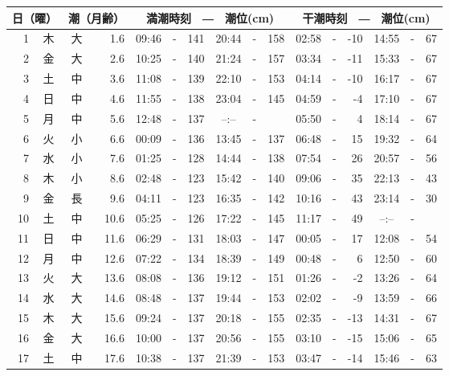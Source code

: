 \documentclass[12pt.a4j]{jsarticle}
\begin{document}
\begin{center}
\begin{table}[ht]
    \begin{tabular}{|rc|cr|ccrccr|ccrccr|}
    \hline
    \multicolumn{2}{|c|}{日（曜）} & \multicolumn{2}{c|}{潮（月齢）} & \multicolumn{6}{c|}{満潮時刻　―　潮位(cm)} & \multicolumn{6}{c|}{干潮時刻　―　潮位(cm)} \\
 \hline
 1 & 木 & 大 &  1.6 &  09:46 &-& 141  &  20:44 &-& 158  &   02:58 &-& -10  &   14:55 &-&  67  \\
 2 & 金 & 大 &  2.6 &  10:25 &-& 140  &  21:24 &-& 157  &   03:34 &-& -11  &   15:33 &-&  67  \\
 3 & 土 & 中 &  3.6 &  11:08 &-& 139  &  22:10 &-& 153  &   04:14 &-& -10  &   16:17 &-&  67  \\
 4 & 日 & 中 &  4.6 &  11:55 &-& 138  &  23:04 &-& 145  &   04:59 &-&  -4  &   17:10 &-&  67  \\
 5 & 月 & 中 &  5.6 &  12:48 &-& 137  &  --:-- &-&     &   05:50 &-&   4  &   18:14 &-&  67  \\
 6 & 火 & 小 &  6.6 &  00:09 &-& 136  &  13:45 &-& 137  &   06:48 &-&  15  &   19:32 &-&  64  \\
 7 & 水 & 小 &  7.6 &  01:25 &-& 128  &  14:44 &-& 138  &   07:54 &-&  26  &   20:57 &-&  56  \\
 8 & 木 & 小 &  8.6 &  02:48 &-& 123  &  15:42 &-& 140  &   09:06 &-&  35  &   22:13 &-&  43  \\
 9 & 金 & 長 &  9.6 &  04:11 &-& 123  &  16:35 &-& 142  &   10:16 &-&  43  &   23:14 &-&  30  \\
10 & 土 & 中 & 10.6 &  05:25 &-& 126  &  17:22 &-& 145  &   11:17 &-&  49  &   --:-- &-&     \\
11 & 日 & 中 & 11.6 &  06:29 &-& 131  &  18:03 &-& 147  &   00:05 &-&  17  &   12:08 &-&  54  \\
12 & 月 & 中 & 12.6 &  07:22 &-& 134  &  18:39 &-& 149  &   00:48 &-&   6  &   12:50 &-&  60  \\
13 & 火 & 大 & 13.6 &  08:08 &-& 136  &  19:12 &-& 151  &   01:26 &-&  -2  &   13:26 &-&  64  \\
14 & 水 & 大 & 14.6 &  08:48 &-& 137  &  19:44 &-& 153  &   02:02 &-&  -9  &   13:59 &-&  66  \\
15 & 木 & 大 & 15.6 &  09:24 &-& 137  &  20:18 &-& 155  &   02:35 &-& -13  &   14:31 &-&  67  \\
16 & 金 & 大 & 16.6 &  10:00 &-& 137  &  20:56 &-& 155  &   03:10 &-& -15  &   15:06 &-&  65  \\
17 & 土 & 中 & 17.6 &  10:38 &-& 137  &  21:39 &-& 153  &   03:47 &-& -14  &   15:46 &-&  63  \\

\end{tabular}
\end{table}
\end{center}
\end{document}
